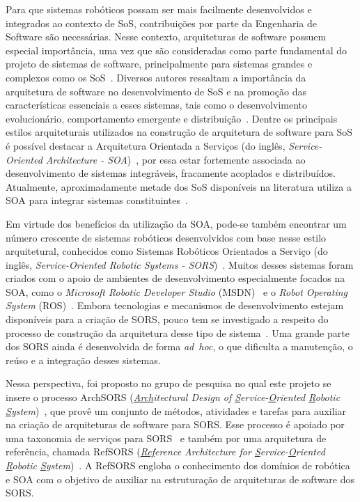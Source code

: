 \documentclass[12pt]{report}
\begin{document}
Para que sistemas robóticos possam ser mais facilmente desenvolvidos e integrados ao contexto de SoS, contribuições por parte da Engenharia de Software são necessárias. Nesse contexto, arquiteturas de software possuem especial importância, uma vez que são consideradas como parte fundamental do projeto de sistemas de software, principalmente para sistemas grandes e complexos como os SoS~\cite{Clements02ESAR}. Diversos autores ressaltam a importância da arquitetura de software no desenvolvimento de SoS e na promoção das características essenciais a esses sistemas, tais como o desenvolvimento evolucionário, comportamento emergente e distribuição~\cite{Jamshidi08SoSE,Maier98APSoS}. Dentre os principais estilos arquiteturais utilizados na construção de arquitetura de software para SoS é possível destacar a Arquitetura Orientada a Serviços (do inglês, \textit{Service-Oriented Architecture - SOA})~\cite{Papazoglou07VLDB}, por essa estar fortemente associada ao desenvolvimento de sistemas integráveis, fracamente acoplados e distribuídos. Atualmente, aproximadamente metade dos SoS disponíveis na literatura utiliza a SOA para integrar sistemas constituintes~\cite{Nakagawa13SAFP}.

Em virtude dos benefícios da utilização da SOA, pode-se também encontrar um número crescente de sistemas robóticos desenvolvidos com base nesse estilo arquitetural, conhecidos como Sistemas Robóticos Orientados a Serviço (do inglês, \textit{Service-Oriented Robotic Systems - SORS})~\cite{Oliveira13SAC}. Muitos desses sistemas foram criados com o apoio de ambientes de desenvolvimento especialmente focados na SOA, como o \textit{Microsoft Robotic Developer Studio} (MSDN)~\cite{Jackson07MRDS} e o \textit{Robot Operating System} (ROS)~\cite{Straszheim11ROS}. Embora tecnologias e mecanismos de desenvolvimento estejam disponíveis para a criação de SORS, pouco tem se investigado a respeito do processo de construção da arquitetura desse tipo de sistema~\cite{Oliveira13SAC}. Uma grande parte dos SORS ainda é desenvolvida de forma \textit{ad~hoc}, o que dificulta a manutenção, o reúso e a integração desses sistemas. 

Nessa perspectiva, foi proposto no grupo de pesquisa no qual este projeto se insere o processo ArchSORS (\textit{\underline{Arch}itectural Design of \underline{S}ervice-\underline{O}riented \underline{R}obotic \underline{S}ystem})~\cite{Oliveira14ECSA}, que provê um conjunto de métodos, atividades e tarefas para auxiliar na criação de arquiteturas de software para SORS. Esse processo é apoiado por uma taxonomia de serviços para SORS~\cite{Oliveira2014SEKE} e também por uma arquitetura de referência, chamada RefSORS (\textit{\underline{Ref}erence Architecture for \underline{S}ervice-\underline{O}riented \underline{R}obotic \underline{S}ystem})~\cite{OliveiraPhD}. A RefSORS engloba o conhecimento dos domínios de robótica e SOA com o objetivo de auxiliar na estruturação de arquiteturas de software dos SORS. 
\end{document}
